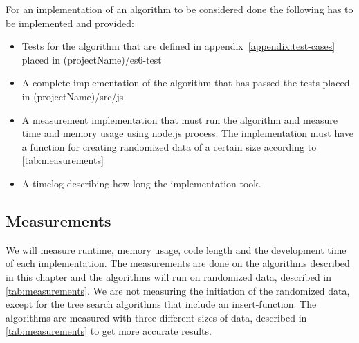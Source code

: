 \documentclass {article}
\begin{document}
For an implementation of an algorithm to be considered done the following has to be implemented and provided:
\begin{itemize}
\item Tests for the algorithm that are defined in appendix~\ref{appendix:test-cases} placed in (projectName)/es6-test
\item A complete implementation of the algorithm that has passed the tests placed in (projectName)/src/js
\item A measurement implementation that must run the algorithm and measure time and memory usage using node.js process. The implementation must have a function for creating randomized data of a certain size according to \ref{tab:measurements} 
\item A timelog describing how long the implementation took. 
\end{itemize}
\subsection{Measurements}
We will measure runtime, memory usage, code length and the development time of each implementation. The measurements are done on the algorithms described in this chapter and the algorithms will run on randomized data, described in \ref{tab:measurements}. We are not measuring the initiation of the randomized data, except for the tree search algorithms that include an insert-function. The algorithms are measured with three different sizes of data, described in \ref{tab:measurements} to get more accurate results.
\end{document}

